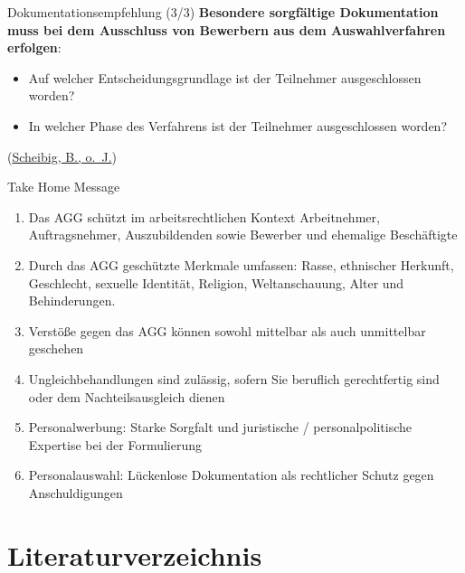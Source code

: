 \documentclass[
  10pt,
  ngerman,
  ignorenonframetext,
]{beamer}
\providecommand{\tightlist}{%
  \setlength{\itemsep}{0pt}\setlength{\parskip}{0pt}}
\begin{document}
\begin{frame}{Dokumentationsempfehlung (3/3)}
\protect\hypertarget{dokumentationsempfehlung-33}{}
\textbf{Besondere sorgfältige Dokumentation muss bei dem Ausschluss von
Bewerbern aus dem Auswahlverfahren erfolgen}:

\begin{itemize}
\tightlist
\item
  Auf welcher Entscheidungsgrundlage ist der Teilnehmer ausgeschlossen
  worden?
\item
  In welcher Phase des Verfahrens ist der Teilnehmer ausgeschlossen
  worden?
\end{itemize}

(\protect\hyperlink{ref-ihk_wsb}{Scheibig, B., o.~J.})
\end{frame}

\begin{frame}{Take Home Message}
\protect\hypertarget{take-home-message}{}
\begin{enumerate}
\tightlist
\item
  Das AGG schützt im arbeitsrechtlichen Kontext Arbeitnehmer,
  Auftragsnehmer, Auszubildenden sowie Bewerber und ehemalige
  Beschäftigte
\item
  Durch das AGG geschützte Merkmale umfassen: Rasse, ethnischer
  Herkunft, Geschlecht, sexuelle Identität, Religion, Weltanschauung,
  Alter und Behinderungen.
\item
  Verstöße gegen das AGG können sowohl mittelbar als auch unmittelbar
  geschehen
\item
  Ungleichbehandlungen sind zulässig, sofern Sie beruflich gerechtfertig
  sind oder dem Nachteilsausgleich dienen
\item
  Personalwerbung: Starke Sorgfalt und juristische / personalpolitische
  Expertise bei der Formulierung
\item
  Personalauswahl: Lückenlose Dokumentation als rechtlicher Schutz gegen
  Anschuldigungen
\end{enumerate}
\end{frame}

\hypertarget{literaturverzeichnis}{%
\section*{Literaturverzeichnis}\label{literaturverzeichnis}}
\end{document}
